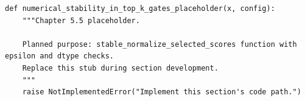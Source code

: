 \begin{lstlisting}[style=bookpython,caption={Planned code placeholder for numerical stability in top k gates.},label={lst:ch05-numerical-stability-in-top-k-gates}]
def numerical_stability_in_top_k_gates_placeholder(x, config):
    """Chapter 5.5 placeholder.

    Planned purpose: stable_normalize_selected_scores function with epsilon and dtype checks.
    Replace this stub during section development.
    """
    raise NotImplementedError("Implement this section's code path.")
\end{lstlisting}
